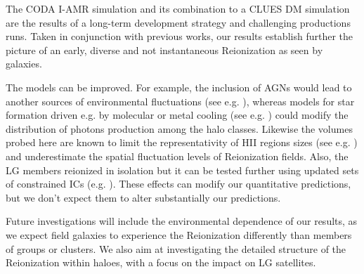 \documentclass[twocolumn]{aastex61}
\begin{document}
The CODA I-AMR simulation and its combination to a CLUES DM simulation are the results of a long-term development strategy and  challenging productions runs. Taken in conjunction with previous works, our results establish further the picture of an early, diverse and not instantaneous Reionization as seen by galaxies. 

The models can be improved. For example, the inclusion of AGNs would lead to another sources of environmental fluctuations (see e.g. \citet{CHA15}), whereas models for star formation driven e.g. by molecular or metal cooling (see e.g. \citet{WIS9}) could modify the distribution of photons production among the halo classes. Likewise the volumes probed here are known to limit the representativity of HII regions sizes (see e.g. \citet{ILI6}) and underestimate the spatial fluctuation levels of Reionization fields.  Also, the LG members reionized in isolation but it can be tested further using updated sets of constrained ICs (e.g. \cite{CARL17}). These effects can modify our quantitative predictions, but we don't expect them to alter substantially our predictions. 

Future investigations will include the environmental dependence of our results, as we expect field galaxies to experience the Reionization differently than members of groups or clusters. We also aim at investigating the detailed structure of the Reionization within haloes, with a focus on the impact on LG satellites.




\end{document}
